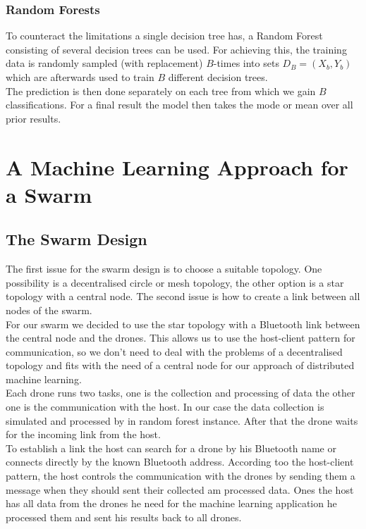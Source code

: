 \subsubsection*{Random Forests}
To counteract the limitations a single decision tree has, a Random Forest consisting of several decision trees can be used. For achieving this, the training data is randomly sampled (with replacement) $B$-times into sets $D_B=(X_b,Y_b)$ which are afterwards used to train $B$ different decision trees. \\

The prediction is then done separately on each tree from which we gain $B$ classifications. For a final result the model then takes the mode or mean over all prior results. 


\section{A Machine Learning Approach for a Swarm}

\subsection{The Swarm Design}

The first issue for the swarm design is to choose a suitable topology. One possibility is a decentralised circle or mesh topology, the other option is a star topology with a central node. The second issue is how to create a link between all nodes of the swarm. \\


For our swarm we decided to use the star topology with a Bluetooth link between the central node and the drones. This allows us to use the host-client pattern for communication, so we don’t need to deal with the problems of a decentralised topology and fits with the need of a central node for our approach of distributed machine learning.  \\

Each drone runs two tasks, one is the collection and processing of data the other one is the communication with the host. In our case the data collection is simulated and processed by in random forest instance. After that the drone waits for the incoming link from the host. \\

To establish a link the host can search for a drone by his Bluetooth name or connects directly by the known Bluetooth address. According too the host-client pattern, the host controls the communication with the drones by sending them a message when they should sent their collected am processed data. Ones the host has all data from the drones he need for the machine learning application he processed them and sent his results back to all drones.

